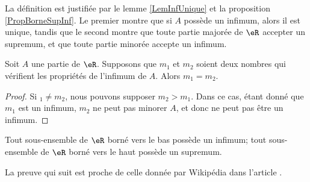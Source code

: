 La définition est justifiée par le lemme \ref{LemInfUnique} et la proposition \ref{PropBorneSupInf}. Le premier montre que si $A$ possède un infimum, alors il est unique, tandis que le second montre que toute partie majorée de $\eR$ accepter un supremum, et que toute partie minorée accepte un infimum.
\begin{lemma}		\label{LemInfUnique}
	Soit $A$ une partie de $\eR$. Supposons que $m_1$ et $m_2$ soient deux nombres qui vérifient les propriétés de l'infimum de $A$. Alors $m_1=m_2$.
\end{lemma}

\begin{proof}
	Si $_1\neq m_2$, nous pouvons supposer $m_2>m_1$. Dans ce cas, étant donné que $m_1$ est un infimum, $m_2$ ne peut pas minorer $A$, et donc ne peut pas être un infimum.
\end{proof}

\begin{proposition}		\label{PropBorneSupInf}
	Tout sous-ensemble de $\eR$ borné vers le bas possède un infimum; tout sous-ensemble de $\eR$ borné vers le haut possède un supremum.
\end{proposition}

La preuve qui suit est proche de celle donnée par Wikipédia  dans l'article .

